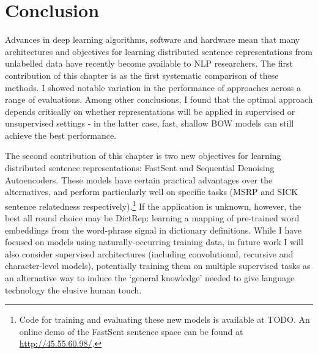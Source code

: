 \section{Conclusion}
Advances in deep learning algorithms, software and hardware mean that many architectures and objectives for learning distributed sentence representations from unlabelled data have recently become available to NLP researchers. The first contribution of this chapter is as the first systematic comparison of these methods. I showed notable variation in the performance of approaches across a range of evaluations. Among other conclusions, I found that the optimal approach depends critically on whether representations will be applied in supervised or unsupervised settings - in the latter case, fast, shallow BOW models can still achieve the best performance. 

The second contribution of this chapter is two new objectives for learning distributed sentence representations: FastSent and Sequential Denoising Autoencoders. These models have certain practical advantages over the alternatives, and perform particularly well on specific tasks (MSRP and SICK sentence relatedness respectively).\footnote{Code for training and evaluating these new models is available at TODO. An online demo of the FastSent sentence space can be found at \url{http://45.55.60.98/}.} If the application is unknown, however, the best all round choice may be DictRep: learning a mapping of pre-trained word embeddings from the word-phrase signal in dictionary definitions. While I have focused on models using naturally-occurring training data, in future work I will also consider supervised architectures (including convolutional, recursive and character-level models), potentially training them on multiple supervised tasks as an alternative way to induce the `general knowledge' needed to give language technology the elusive human touch. 